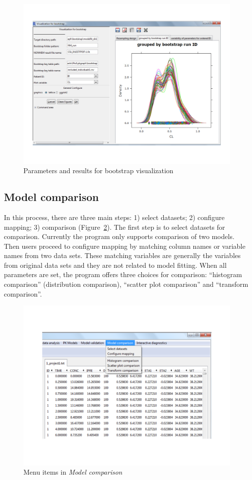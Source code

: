 \documentclass[a4paper]{article}
\begin{document}
\begin{figure}[h!tb] \centering
\includegraphics[scale=0.6]{bootPara.pdf}
\caption{Parameters and results for bootstrap visualization}
\label{bootPara}
\end{figure}
\subsection{Model comparison}
In this process, there are three main steps: 1) select datasets; 2) configure mapping; 3) comparison (Figure~\ref{modelc}). The first step is to select datasets for comparison. Currently the program only supports comparison of two models. Then users proceed to configure mapping by matching column names or variable names from two data sets. These matching variables are generally the variables from original data sets and they are not related to model fitting. When all parameters are set, the program offers three choices for comparison: ``histogram comparison'' (distribution comparison), ``scatter plot comparison'' and ``transform comparison''.
\begin{figure}[h!tb] \centering
\includegraphics[scale=0.6]{modelc.pdf}
\caption{Menu items in \textit{Model comparison}}
\label{modelc}
\end{figure}
\end{document}
